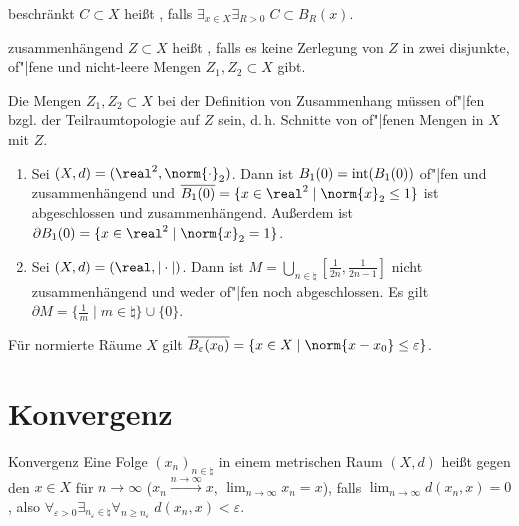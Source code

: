 \begin{Def}{beschränkt}
    $C \subset X$ heißt , falls
    $\exists_{x \in X} \exists_{R > 0}\; C \subset B_R(x)$.
\end{Def}

\begin{Def}{zusammenhängend}
    $Z \subset X$ heißt , falls
    es keine Zerlegung von $Z$ in zwei disjunkte, of"|fene und nicht-leere Mengen
    $Z_1, Z_2 \subset X$ gibt.
\end{Def}

\begin{Bem}
    Die Mengen $Z_1, Z_2 \subset X$ bei der Definition von Zusammenhang müssen of"|fen
    bzgl. der Teilraumtopologie auf $Z$ sein, d.\,h. Schnitte von of"|fenen Mengen in $X$
    mit $Z$.
\end{Bem}

\begin{Bsp}
    \begin{enumerate}[label=\emph{(\alph*)}]
        \item
        Sei $(X, d) = (\real^2, \norm{\cdot}_2)$.
        Dann ist $B_1(0) = \operatorname{int}(B_1(0))$ of"|fen und zusammenhängend und
        $\overline{B_1(0)} = \{x \in \real^2 \;|\; \norm{x}_2 \le 1\}$ ist  abgeschlossen und
        zusammenhängend.
        Außerdem ist $\partial B_1(0) = \{x \in \real^2 \;|\; \norm{x}_2 = 1\}$.

        \item
        Sei $(X, d) = (\real, |\cdot|)$.
        Dann ist $M = \bigcup_{n \in \natural} \left[\frac{1}{2n}, \frac{1}{2n-1}\right]$
        nicht zusammenhängend und weder of"|fen noch abgeschlossen.
        Es gilt $\partial M = \{\frac{1}{m} \;|\; m \in \natural\} \cup \{0\}$.
    \end{enumerate}
\end{Bsp}

\begin{Bem}
    Für normierte Räume $X$ gilt
    $\overline{B_\varepsilon(x_0)} = \{x \in X \;|\; \norm{x - x_0} \le \varepsilon\}$.
\end{Bem}

\section{%
    Konvergenz%
}

\begin{Def}{Konvergenz}
    Eine Folge $(x_n)_{n \in \natural}$ in einem metrischen Raum $(X, d)$
    heißt  gegen den  $x \in X$ für $n \to \infty$
    ($x_n \xrightarrow{n \to \infty} x$, $\lim_{n \to \infty} x_n = x$), falls
    $\lim_{n \to \infty} d(x_n, x) = 0$,
    also $\forall_{\varepsilon > 0} \exists_{n_\varepsilon \in \natural}
    \forall_{n \ge n_\varepsilon}\; d(x_n, x) < \varepsilon$.
\end{Def}

